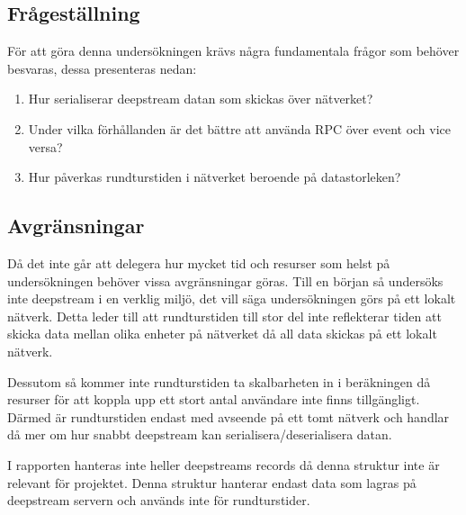 \subsection{Frågeställning}
\label{subsec:tim-research-questions}
För att göra denna undersökningen krävs några fundamentala frågor som behöver besvaras, dessa presenteras nedan:
\begin{enumerate}

\item\label{tim-fs:1} Hur serialiserar deepstream datan som skickas över nätverket?

\item\label{tim-fs:2} Under vilka förhållanden är det bättre att använda RPC över event och vice versa?

\item\label{tim-fs:3} Hur påverkas rundturstiden i nätverket beroende på datastorleken?  

\end{enumerate}

\subsection{Avgränsningar}
\label{subsec:tim-delimitations}
Då det inte går att delegera hur mycket tid och resurser som helst på undersökningen behöver vissa avgränsningar göras. Till en början så undersöks inte deepstream i en verklig miljö, det vill säga undersökningen görs på ett lokalt nätverk. Detta leder till att rundturstiden till stor del inte reflekterar tiden att skicka data mellan olika enheter på nätverket då all data skickas på ett lokalt nätverk.

Dessutom så kommer inte rundturstiden ta skalbarheten in i beräkningen då resurser för att koppla upp ett stort antal användare inte finns tillgängligt. Därmed är rundturstiden endast med avseende på ett tomt nätverk och handlar då mer om hur snabbt deepstream kan serialisera/deserialisera datan.

I rapporten hanteras inte heller deepstreams records då denna struktur inte är relevant för projektet. Denna struktur hanterar endast data som lagras på deepstream servern och används inte för rundturstider.
